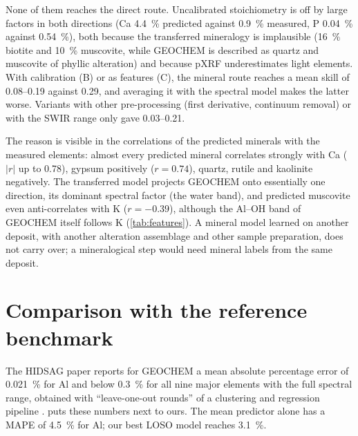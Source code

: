 \documentclass[11pt,a4paper]{article}
\begin{document}
None of them reaches the direct route. Uncalibrated stoichiometry is off by large factors in both directions (Ca
\SI{4.4}{\percent} predicted against \SI{0.9}{\percent} measured, P \SI{0.04}{\percent} against
\SI{0.54}{\percent}), both because the transferred mineralogy is
implausible (\SI{16}{\percent} biotite and \SI{10}{\percent} muscovite, while GEOCHEM is described as quartz and
muscovite of phyllic alteration) and because pXRF underestimates light elements. With calibration (B) or as
features (C), the mineral route reaches a mean skill of 0.08--0.19 against 0.29, and averaging it with the spectral
model makes the latter worse. Variants with other pre-processing (first derivative, continuum removal) or with the
SWIR range only gave 0.03--0.21.

The reason is visible in the correlations of the predicted minerals with the measured elements: almost every
predicted mineral correlates strongly with Ca ($|r|$ up to 0.78), gypsum positively ($r = 0.74$), quartz, rutile and
kaolinite negatively. The transferred model projects GEOCHEM onto essentially one direction, its dominant spectral
factor (the water band), and predicted muscovite even anti-correlates with K ($r = -0.39$), although the Al--OH
band of GEOCHEM itself follows K (\cref{tab:features}). A mineral model learned on another deposit, with another
alteration assemblage and other sample preparation, does not carry over; a mineralogical step would need mineral
labels from the same deposit.

\begin{table}[t]
  \centering\small
  \caption{Mineralogy route (LOSO on GEOCHEM, mineral model trained on MINERAL1). Skill: mean over Al \ldots Cu.
    Uncalibrated stoichiometry (route A) has large negative skills (mean $-7.4$) and is omitted.}
  \label{tab:mineralogy}
  \resizebox{\linewidth}{!}{}
\end{table}

\section{Comparison with the reference benchmark}\label{sec:leakage}

The HIDSAG paper reports for GEOCHEM a mean absolute percentage error of \SI{0.021}{\percent} for Al and below
\SI{0.3}{\percent} for all nine major elements with the full spectral range, obtained with ``leave-one-out rounds''
of a clustering and regression pipeline \citep[Table 5]{Ehrenfeld2023}.  puts these numbers next to
ours. The mean predictor alone has a MAPE of \SI{4.5}{\percent} for Al; our best LOSO model reaches
\SI{3.1}{\percent}.
\end{document}
